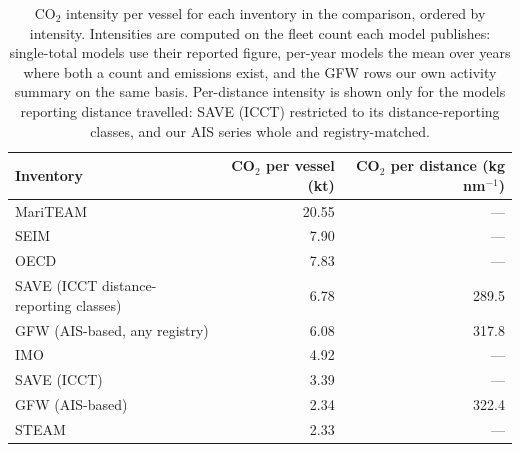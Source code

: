 \begin{table}[!h]
\centering
\caption{\label{tab:inventory_intensity_all_models}CO$_2$ intensity per vessel for each inventory in the comparison, ordered by intensity. Intensities are computed on the fleet count each model publishes: single-total models use their reported figure, per-year models the mean over years where both a count and emissions exist, and the GFW rows our own activity summary on the same basis. Per-distance intensity is shown only for the models reporting distance travelled: SAVE (ICCT) restricted to its distance-reporting classes, and our AIS series whole and registry-matched.}
\centering
\fontsize{8}{10}\selectfont
\begin{tabular}[t]{lrr}
\toprule
Inventory & CO$_2$ per vessel (kt) & CO$_2$ per distance (kg nm$^{-1}$)\\
\midrule
MariTEAM & 20.55 & ---\\
SEIM & 7.90 & ---\\
OECD & 7.83 & ---\\
SAVE (ICCT distance-reporting classes) & 6.78 & 289.5\\
GFW (AIS-based, any registry) & 6.08 & 317.8\\
\addlinespace
IMO & 4.92 & ---\\
SAVE (ICCT) & 3.39 & ---\\
GFW (AIS-based) & 2.34 & 322.4\\
STEAM & 2.33 & ---\\
\bottomrule
\end{tabular}
\end{table}
